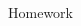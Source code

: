 \documentclass[12pt, a4paper, addpoints]{exam}
\begin{document}
\begin{questions}
\begin{multicols}{5}
\begin{parts}
\end{parts}
\end{multicols}


\question Homework 
\begin{multicols}{4}
\begin{parts}
\part 

\end{parts}
\end{multicols}


\end{questions}
\end{document}
